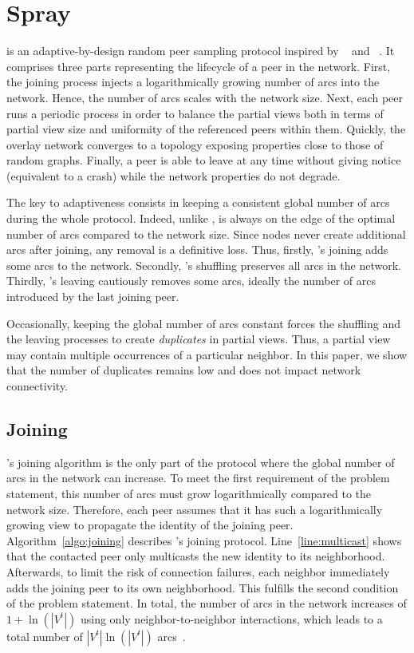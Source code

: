 
\section{Spray}
\label{sec:proposal}

\SPRAY is an adaptive-by-design random peer sampling protocol inspired by
\SCAMP~\cite{ganesh2003peer} and \CYCLON~\cite{voulgaris2005cyclon}. It
comprises three parts representing the lifecycle of a peer in the network.
First, the joining process injects a logarithmically growing number of arcs
into the network. Hence, the number of arcs scales with the network size.  Next,
each peer runs a periodic process in order to balance the partial views both in
terms of partial view size and uniformity of the referenced peers within
them. Quickly, the overlay network converges to a topology exposing properties
close to those of random graphs. Finally, a peer is able to leave at any time 
without giving notice (equivalent to a crash) while the network properties do
not degrade.

The key to adaptiveness consists in keeping a consistent global number
of arcs during the whole protocol. Indeed, unlike \CYCLON, \SPRAY is
always on the edge of the optimal number of arcs compared to the
network size. Since \SPRAY nodes never create additional arcs after
joining, any removal is a definitive loss. Thus, firstly, \SPRAY's
joining adds some arcs to the network. Secondly, \SPRAY's shuffling
preserves all arcs in the network. Thirdly, \SPRAY's leaving
cautiously removes some arcs, ideally the number of arcs introduced by
the last joining peer.

Occasionally, keeping the global number of arcs constant forces the shuffling
and the leaving processes to create \emph{duplicates} in partial views. Thus,
a partial view may contain multiple occurrences of a particular neighbor. In this
paper, we show that the number of duplicates remains low and does not
impact network connectivity.

\subsection{Joining}
\label{subsec:joining}

\SPRAY's joining algorithm is the only part of the protocol where the
global number of arcs in the network can increase. To meet the first
requirement of the problem statement, this number of arcs must grow
logarithmically compared to the network size. 
Therefore, each peer assumes that it has such a logarithmically
growing view to propagate the identity of the joining
peer. Algorithm~\ref{algo:joining} describes \SPRAY's joining
protocol. Line~\ref{line:multicast} shows that the contacted peer only
multicasts the new identity to its neighborhood. Afterwards, to limit
the risk of connection failures, each neighbor immediately adds the
joining peer to its own neighborhood. This fulfills the second
condition of the problem statement.  In total, the number of arcs in
the network increases of $1+\ln(|V^t|)$ using only
neighbor-to-neighbor interactions, which leads to a total number of
$|V^t|\ln(|V^t|)$ arcs~\cite{ganesh2001scamp}.

